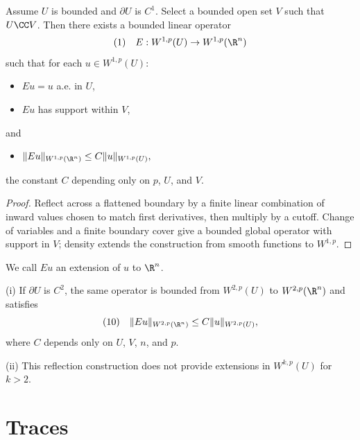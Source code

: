 \begin{theorem}
\label{thm:sobolev-extension-theorem}
Assume $U$ is bounded and $\partial U$ is $C^1$. Select a bounded open set $V$ such that $U \CC V$. Then there exists a bounded linear operator
$$(1) \quad E: W^{1,p}(U) \to W^{1,p}(\R^n)$$
such that for each $u \in W^{1,p}(U)$:
\begin{itemize}
\item[(i)] $Eu = u$ a.e. in $U$,
\item[(ii)] $Eu$ has support within $V$,
\end{itemize}
and
\begin{itemize}
\item[(iii)] $\|Eu\|_{W^{1,p}(\R^n)} \le C\|u\|_{W^{1,p}(U)},$
\end{itemize}
the constant $C$ depending only on $p$, $U$, and $V$.
\end{theorem}

\begin{proof}
\sketch Reflect across a flattened boundary by a finite linear combination of inward values chosen to match first derivatives, then multiply by a cutoff. Change of variables and a finite boundary cover give a bounded global operator with support in $V$; density extends the construction from smooth functions to $W^{1,p}$.
\end{proof}

\begin{definition}
\label{def:extension-of-sobolev-function}
We call $Eu$ an extension of $u$ to $\R^n$.
\end{definition}

\begin{remark}
\label{rem:extension-higher-order-remark}
(i) If $\partial U$ is $C^2$, the same operator is bounded from $W^{2,p}(U)$ to $W^{2,p}(\R^n)$ and satisfies
$$(10) \quad \|Eu\|_{W^{2,p}(\R^n)} \le C\|u\|_{W^{2,p}(U)},$$
where $C$ depends only on $U$, $V$, $n$, and $p$.

(ii) This reflection construction does not provide extensions in $W^{k,p}(U)$ for $k>2$.
\end{remark}

\section{Traces}
\label{sec:sobolev-traces}

